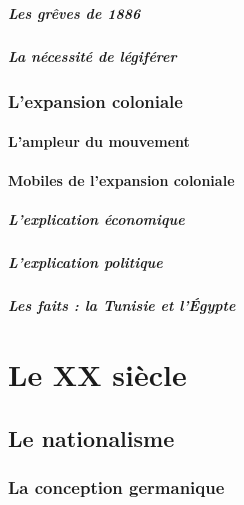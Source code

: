 \documentclass[12pt]{report}
\begin{document}
\subsubsection{Les grêves de 1886}

\subsubsection{La nécessité de légiférer}

\section{L'expansion coloniale}

\subsection{L'ampleur du mouvement}

\subsection{Mobiles de l'expansion coloniale}

\subsubsection{L'explication économique}

\subsubsection{L'explication politique}

\subsubsection{Les faits : la Tunisie et l'Égypte}




\part{Le XX siècle}

\chapter{Le nationalisme}

\section{La conception germanique}
\end{document}
